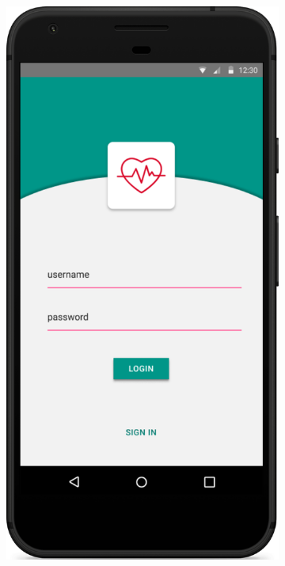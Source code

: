 \documentclass[../main.tex]{subfiles}
\begin{document}
\begin{figure}[H]
	\centering
	\begin{subfigure}[b]{0.45\linewidth}
		\includegraphics[width=\linewidth]{images/mockup/LoginPage.png}

\end{subfigure}
\end{figure}
\end{document}
